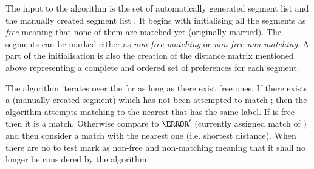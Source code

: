 
    The input to the algorithm is the set of automatically generated segment list \aslist and the manually created segment list \mslist.  It begins with initialising all the segments as \textit{free} meaning that none of them are matched yet (originally married). The segments can be marked either as \textit{non-free matching} or \textit{non-free non-matching}. A part of the initialisation is also the creation of the distance matrix mentioned above representing a complete and ordered set of preferences for each segment. 

    The algorithm iterates over the \aslist for as long as there exist free ones. If there exists a \ms (manually created segment) which has not been attempted to match \as; then the algorithm attempts matching \as to the nearest \ms that has the same label. If \ms is free then it is a match. Otherwise compare \as to $\as'$ (currently assigned match of \ms) and then consider a match with the nearest one (i.e. shortest distance). When there are no \mslist to test mark \as as non-free and non-matching meaning that it shall no longer be considered by the algorithm.

